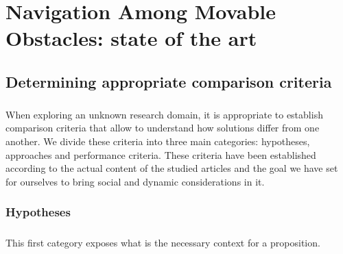 
\chapter{Navigation Among Movable Obstacles: state of the art} %

\label{Chapter2} %

\section{Determining appropriate comparison criteria}

\paragraph{} When exploring an unknown research domain, it is appropriate to establish comparison criteria that allow to understand how solutions differ from one another. We divide these criteria into three main categories: hypotheses, approaches and performance criteria. These criteria have been established according to the actual content of the studied articles and the goal we have set for ourselves to bring social and dynamic considerations in it.

\subsection{Hypotheses}

\paragraph{} This first category exposes what is the necessary context for a proposition.

